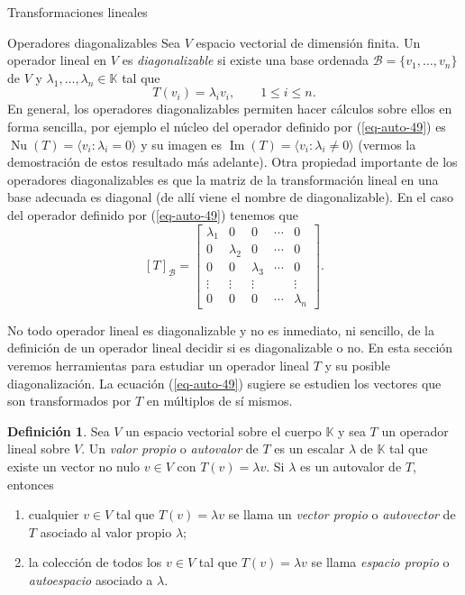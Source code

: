 \documentclass[a4paper,12pt,twoside,spanish,reqno]{amsbook}
\numberwithin{equation}{section}
\theoremstyle{definition}
\newtheorem{definicion}[teorema]{Definici\'on}
\theoremstyle{remark}
\newcommand{\img}{\operatorname{Im}}
\newcommand{\nuc}{\operatorname{Nu}}
\newcommand{\K}{\mathbb K}
\begin{document}
\begin{chapter}{Transformaciones lineales}
\begin{section}{Operadores diagonalizables}
        Sea $V$ espacio vectorial de dimensión finita. Un operador lineal en $V$ es \textit{diagonalizable}  si existe una base ordenada $\mathcal B= \{v_1,\ldots,v_n\}$ de $V$ y $\lambda_1,\ldots,\lambda_n \in \K$ tal que 
        \begin{equation}\label{eq-auto-49}
            T(v_i) = \lambda_i v_i,\qquad 1\le i \le n. 
        \end{equation}
        En  general, los operadores diagonalizables permiten hacer cálculos sobre ellos en forma sencilla, por ejemplo el núcleo del  operador definido por (\ref{eq-auto-49}) es $\nuc(T)=\langle v_i: \lambda_i =0 \rangle$ y  su imagen es $\img(T)=\langle v_i: \lambda_i \not=0 \rangle$ (vermos la demostración de estos resultado más adelante). 
        Otra propiedad importante de los operadores diagonalizables es que la matriz de la transformación lineal en una base adecuada es diagonal (de allí viene el nombre de diagonalizable). En  el caso del  operador definido por (\ref{eq-auto-49}) tenemos que
        $$
        [T]_{\mathcal B} = 
        \begin{bmatrix}
        \lambda_1&0&0&\cdots&0 \\
        0&\lambda_2&0&\cdots&0\\
        0&0&\lambda_3&\cdots&0\\
        \vdots&\vdots&\vdots&&\vdots\\
        0&0&0&\cdots&\lambda_n
        \end{bmatrix}.
        $$
        
        
        No todo operador lineal es diagonalizable y no es inmediato, ni sencillo, de la definición de un operador lineal decidir si es diagonalizable o no. En esta sección veremos herramientas para estudiar un operador lineal $T$ y su posible diagonalización. La ecuación (\ref{eq-auto-49}) sugiere se estudien los vectores que son transformados por $T$ en múltiplos de sí mismos.
        
        \begin{definicion}
            Sea $V$ un espacio vectorial sobre el cuerpo $\K$ y sea $T$ un operador lineal sobre $V$. Un \textit{valor propio} o \textit{autovalor} de $T$ es un escalar $\lambda$ de $\K$ tal que existe un vector no nulo $v \in V$ con $T(v) = \lambda v$. Si $\lambda$ es un autovalor de $T$, entonces
            \begin{enumerate}
                \item  cualquier  $v \in V$ tal que $T(v) = \lambda v$  se llama un \textit{vector propio} o  \textit{autovector} de $T$ asociado al valor propio $\lambda$;
                \item la colección de todos los $v \in V$ tal que $T(v) = \lambda v$  se llama \textit{espacio propio} o \textit{autoespacio} 	asociado a $\lambda$. 
            \end{enumerate}
            

\end{definicion}
\end{section}
\end{chapter}
\end{document}
